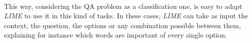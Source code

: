 \paragraph{}
This way, considering the QA problem as a classification one, is easy to adapt \emph{LIME} to use it in this kind of tasks. In these cases, \emph{LIME} can take as input the context, the question, the options or any combination possible between them, explaining for instance which words are important of every single option.
